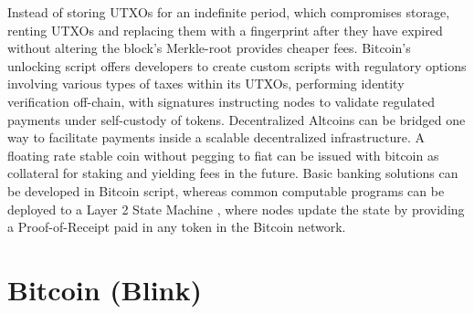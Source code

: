 \documentclass[a4paper, 10pt]{extarticle}
\begin{document}
Instead of storing UTXOs for an indefinite period, which compromises storage, renting UTXOs and replacing them with a fingerprint after they have expired without altering the block’s Merkle-root provides cheaper fees. Bitcoin’s unlocking script offers developers to create custom scripts with regulatory options involving various types of taxes within its UTXOs, performing identity verification off-chain, with signatures instructing nodes to validate regulated payments under self-custody of tokens. Decentralized Altcoins can be bridged one way to facilitate payments inside a scalable decentralized infrastructure. A floating rate stable coin \cite{stablecoin} without pegging to fiat can be issued with bitcoin as collateral for staking and yielding fees in the future. Basic banking solutions can be developed in Bitcoin script, whereas common computable programs can be deployed to a Layer 2 State Machine \cite{wood2014ethereum}, where nodes update the state by providing a Proof-of-Receipt paid in any token in the Bitcoin network.
\section{Bitcoin (Blink)} 
\end{document}
